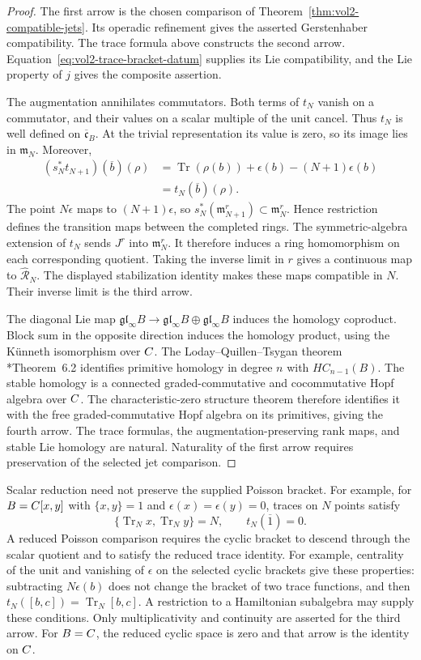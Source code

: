 \begin{proof}
The first arrow is the chosen comparison of
Theorem~\ref{thm:vol2-compatible-jets}.
Its operadic refinement gives the asserted Gerstenhaber compatibility.
The trace formula above constructs the second arrow.
Equation~\eqref{eq:vol2-trace-bracket-datum} supplies its Lie compatibility,
and the Lie property of $j$ gives the composite assertion.

The augmentation annihilates commutators.
Both terms of $t_N$ vanish on a commutator, and their values on a scalar
multiple of the unit cancel.
Thus $t_N$ is well defined on $\overline{\mathfrak c}_B$.
At the trivial representation its value is zero, so its image lies in $\mathfrak m_N$.
Moreover,
\[
\begin{split}
 (s_N^*t_{N+1})(\overline b)(\rho)
 &=\operatorname{Tr}(\rho(b))+\epsilon(b)-(N+1)\epsilon(b)\\
 &=t_N(\overline b)(\rho).
\end{split}
\]
The point $N\epsilon$ maps to $(N+1)\epsilon$, so
$s_N^*(\mathfrak m_{N+1}^r)\subset\mathfrak m_N^r$.
Hence restriction defines the transition maps between the completed rings.
The symmetric-algebra extension of $t_N$ sends $J^r$ into $\mathfrak m_N^r$.
It therefore induces a ring homomorphism on each corresponding quotient.
Taking the inverse limit in $r$ gives a continuous map to
$\widehat{\mathcal R}_N$.
The displayed stabilization identity makes these maps compatible in $N$.
Their inverse limit is the third arrow.

The diagonal Lie map
$\mathfrak{gl}_\infty B\to
 \mathfrak{gl}_\infty B\oplus\mathfrak{gl}_\infty B$
induces the homology coproduct.
Block sum in the opposite direction induces the homology product,
using the K\"unneth isomorphism over $C$.
The Loday--Quillen--Tsygan theorem
\cite{LodayQuillenMatrices}*{Theorem~6.2} identifies primitive homology
in degree $n$ with $HC_{n-1}(B)$.
The stable homology is a connected graded-commutative and cocommutative
Hopf algebra over $C$.  The characteristic-zero structure theorem
therefore identifies it with the free graded-commutative Hopf algebra
on its primitives, giving the fourth arrow.
The trace formulas, the augmentation-preserving rank maps, and stable
Lie homology are natural.
Naturality of the first arrow requires preservation of the selected jet comparison.
\end{proof}

Scalar reduction need not preserve the supplied Poisson bracket.
For example, for $B=C[x,y]$ with $\{x,y\}=1$ and
$\epsilon(x)=\epsilon(y)=0$, traces on $N$ points satisfy
\[
 \{\operatorname{Tr}_Nx,\operatorname{Tr}_Ny\}=N,
 \qquad t_N(\overline1)=0.
\]
A reduced Poisson comparison requires the cyclic bracket to descend
through the scalar quotient and to satisfy the reduced trace identity.
For example, centrality of the unit and vanishing of $\epsilon$ on
the selected cyclic brackets give these properties: subtracting
$N\epsilon(b)$ does not change the bracket of two trace functions,
and then $t_N([b,c])=\operatorname{Tr}_N[b,c]$.
A restriction to a Hamiltonian subalgebra may supply these conditions.
Only multiplicativity and continuity are asserted for the third arrow.
For $B=C$, the reduced cyclic space is zero and that arrow is the identity on $C$.

